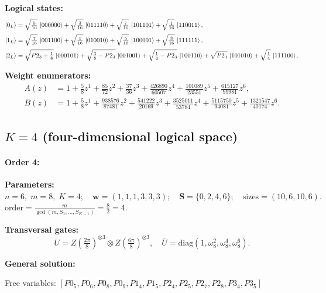 \documentclass[11pt]{article}
\begin{document}
\noindent\textbf{Logical states:}
\begin{align*}
\ket{0_L} &= \sqrt{\tfrac{5}{16}}\,\ket{000000} + \sqrt{\tfrac{3}{16}}\,\ket{011110} + \sqrt{\tfrac{7}{16}}\,\ket{101101} + \sqrt{\tfrac{1}{16}}\,\ket{110011},
\\[2pt]
\ket{1_L} &= \sqrt{\tfrac{7}{16}}\,\ket{001100} + \sqrt{\tfrac{1}{16}}\,\ket{010010} + \sqrt{\tfrac{5}{16}}\,\ket{100001} + \sqrt{\tfrac{3}{16}}\,\ket{111111},
\\[2pt]
\ket{2_L} &= \sqrt{P2_3 + \tfrac{1}{8}}\,\ket{000101} + \sqrt{\tfrac{3}{8} - P2_3}\,\ket{001001} + \sqrt{\tfrac{1}{4} - P2_3}\,\ket{100110} + \sqrt{P2_3}\,\ket{101010} + \sqrt{\tfrac{1}{4}}\,\ket{111100}.
\end{align*}

\noindent\textbf{Weight enumerators:}
\begin{align*}
A(z) &= 1 + \tfrac{5}{8}z^{1} + \tfrac{85}{72}z^{2} + \tfrac{37}{36}z^{3} + \tfrac{426890}{60507}z^{4} + \tfrac{101089}{23551}z^{5} + \tfrac{615127}{99981}z^{6},\\[2pt]
B(z) &= 1 + \tfrac{5}{8}z^{1} + \tfrac{938576}{87481}z^{2} + \tfrac{541222}{20169}z^{3} + \tfrac{3525011}{53784}z^{4} + \tfrac{5115750}{94081}z^{5} + \tfrac{1321547}{40174}z^{6}.
\end{align*}

\subsection{$K=4$ (four-dimensional logical space)}



\paragraph{\textbf{Order 4:}} 
\noindent\textbf{Parameters:} $n=6,\; m=8,\; K=4;\quad \mathbf w=(1, 1, 1, 3, 3, 3);\quad \mathbf S=\{0, 2, 4, 6\};\quad \text{sizes}=\left(10, 6, 10, 6\right).$
$\displaystyle \text{order}=\frac{m}{\gcd(m,S_1,\dots,S_{K-1})}=\frac{8}{2}=4.$

\noindent\textbf{Transversal gates:}
\[
    U=Z \left(\tfrac{2\pi}{8}\right)^{\otimes3} \otimes Z \left(\tfrac{6\pi}{8}\right)^{\otimes3},\quad
    \overline U=\mathrm{diag}(1,\omega_8^{2},\omega_8^{4},\omega_8^{6}).
\]

\noindent\textbf{General solution:}

Free variables: $[P0_5, P0_6, P0_8, P0_9, P1_4, P1_5, P2_4, P2_5, P2_7, P2_8, P3_4, P3_5]$
\end{document}
